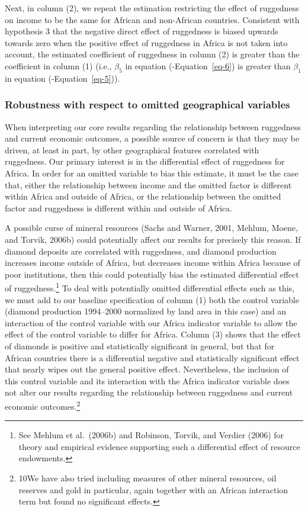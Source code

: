 \documentclass[
  letterpaper,
  DIV=11,
  numbers=noendperiod]{scrartcl}
\begin{document}
Next, in column (2), we repeat the estimation restricting the effect of
ruggedness on income to be the same for African and non-African
countries. Consistent with hypothesis 3 that the negative direct effect
of ruggedness is biased upwards towards zero when the positive effect of
ruggedness in Africa is not taken into account, the estimated
coefficient of ruggedness in column (2) is greater than the coefficient
in column (1) (i.e., \(\beta_5\) in equation (-Equation~\ref{eq-6}) is
greater than \(\beta_1\) in equation (-Equation~\ref{eq-5})).

\subsubsection{Robustness with respect to omitted geographical
variables}\label{robustness-with-respect-to-omitted-geographical-variables}

When interpreting our core results regarding the relationship between
ruggedness and current economic outcomes, a possible source of concern
is that they may be driven, at least in part, by other geographical
features correlated with ruggedness. Our primary interest is in the
differential effect of ruggedness for Africa. In order for an omitted
variable to bias this estimate, it must be the case that, either the
relationship between income and the omitted factor is different within
Africa and outside of Africa, or the relationship between the omitted
factor and ruggedness is different within and outside of Africa.

A possible curse of mineral resources (Sachs and Warner, 2001, Mehlum,
Moene, and Torvik, 2006b) could potentially affect our results for
precisely this reason. If diamond deposits are correlated with
ruggedness, and diamond production increases income outside of Africa,
but decreases income within Africa because of poor institutions, then
this could potentially bias the estimated differential effect of
ruggedness.\footnote{See Mehlum et al.~(2006b) and Robinson, Torvik, and
  Verdier (2006) for theory and empirical evidence supporting such a
  differential effect of resource endowments.} To deal with potentially
omitted differential effects such as this, we must add to our baseline
specification of column (1) both the control variable (diamond
production 1994--2000 normalized by land area in this case) and an
interaction of the control variable with our Africa indicator variable
to allow the effect of the control variable to differ for Africa. Column
(3) shows that the effect of diamonds is positive and statistically
significant in general, but that for African countries there is a
differential negative and statistically significant effect that nearly
wipes out the general positive effect. Nevertheless, the inclusion of
this control variable and its interaction with the Africa indicator
variable does not alter our results regarding the relationship between
ruggedness and current economic outcomes.\footnote{10We have also tried
  including measures of other mineral resources, oil reserves and gold
  in particular, again together with an African interaction term but
  found no significant effects.}
\end{document}
